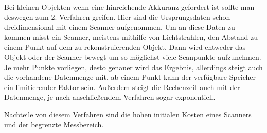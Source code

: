 \documentclass[../main.tex]{subfiles}
\begin{document}
Bei kleinen Objekten wenn eine hinreichende Akkuranz gefordert ist sollte man 
deswegen zum 2. Verfahren greifen. Hier sind die Ursprungsdaten schon 
dreidimensional mit einem Scanner aufgenommen. Um an diese Daten zu kommen 
misst ein Scanner, meistens mithilfe von Lichtstrahlen, den Abstand zu einem 
Punkt auf dem zu rekonstruierenden Objekt. Dann wird entweder das Objekt oder 
der Scanner bewegt um so möglichst viele Scanpunkte aufzunehmen.
Je mehr Punkte vorliegen, desto genauer wird das Ergebnis, allerdings steigt
auch die vorhandene Datenmenge mit, ab einem Punkt kann der verfügbare 
Speicher ein limitierender Faktor sein. Außerdem steigt die Rechenzeit auch mit
der Datenmenge, je nach anschließendem Verfahren sogar exponentiell.

Nachteile von diesem Verfahren sind die hohen initialen Kosten eines Scanners 
und der begrenzte Messbereich. 
\end{document}
